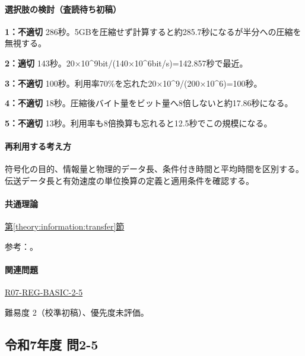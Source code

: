 \paragraph{選択肢の検討（査読待ち初稿）}\mbox{}\par

\noindent\textbf{1：不適切} 286秒。5GBを圧縮せず計算すると約285.7秒になるが半分への圧縮を無視する。\par

\noindent\textbf{2：適切} 143秒。20×10\textasciicircum{}9bit/(140×10\textasciicircum{}6bit/s)=\allowbreak{}142.857秒で最近。\par

\noindent\textbf{3：不適切} 100秒。利用率70\%を忘れた20×10\textasciicircum{}9/(200×10\textasciicircum{}6)=\allowbreak{}100秒。\par

\noindent\textbf{4：不適切} 18秒。圧縮後バイト量をビット量へ8倍しないと約17.86秒になる。\par

\noindent\textbf{5：不適切} 13秒。利用率も8倍換算も忘れると12.5秒でこの規模になる。\par

\paragraph{再利用する考え方} 符号化の目的、情報量と物理的データ長、条件付き時間と平均時間を区別する。伝送データ長と有効速度の単位換算の定義と適用条件を確認する。

\paragraph{共通理論} \hyperref[theory:information:transfer]{第\ref*{theory:information:transfer}節}

\par 参考：\cite{info_deflate}。

\paragraph{関連問題} \hyperref[q:r07-reg-basic-2-5]{R07-REG-BASIC-2-5}

\par 難易度 2（校準初稿）、優先度未評価。

\subsection{令和7年度 問2-5}
\label{q:r07-reg-basic-2-5}

